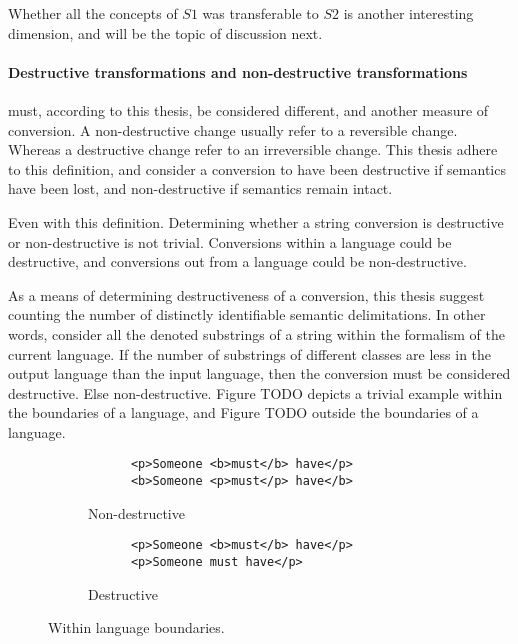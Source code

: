 \documentclass{scrreprt}
\begin{document}
Whether all the concepts of $S1$ was transferable to $S2$ is another interesting dimension, and will be the topic of discussion next.


\paragraph{Destructive transformations and non-destructive transformations} must, according to this thesis, be considered different, and another measure of conversion. A non-destructive change usually refer to a reversible change. Whereas a destructive change refer to an irreversible change. This thesis adhere to this definition, and consider a conversion to have been destructive if semantics have been lost, and non-destructive if semantics remain intact.

Even with this definition. Determining whether a string conversion is destructive or non-destructive is not trivial. Conversions within a language could be destructive, and conversions out from a language could be non-destructive.

As a means of determining destructiveness of a conversion, this thesis suggest counting the number of distinctly identifiable semantic delimitations. In other words, consider all the denoted substrings of a string within the formalism of the current language. If the number of substrings of different classes are less in the output language than the input language, then the conversion must be considered destructive. Else non-destructive. Figure TODO depicts a trivial example within the boundaries of a language, and Figure TODO outside the boundaries of a language.


\begin{figure}[h]
  \centering
  
  \begin{subfigure}{.5\textwidth}
    \begin{lstlisting}
      <p>Someone <b>must</b> have</p>
      <b>Someone <p>must</p> have</b>
    \end{lstlisting}

    \caption{Non-destructive}

  \end{subfigure}%
  \begin{subfigure}{.5\textwidth}

    \begin{lstlisting}
      <p>Someone <b>must</b> have</p>
      <p>Someone must have</p>
    \end{lstlisting}

    \caption{Destructive}
  \end{subfigure}

  \caption{Within language boundaries.}
\end{figure}
\end{document}
